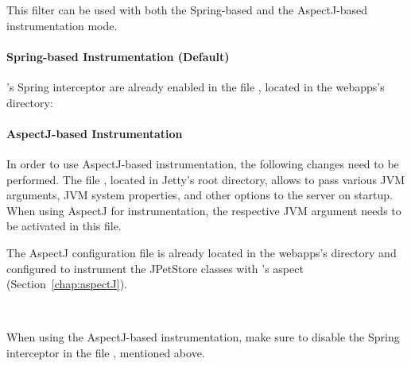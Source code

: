 \noindent This filter can be used with both the Spring-based and the %
AspectJ-based instrumentation mode.

\paragraph{Spring-based Instrumentation (Default)}

\Kieker{}'s Spring interceptor are already enabled in the file 
, located in the webapps's  directory: 

\setXMLListing



\paragraph{AspectJ-based Instrumentation}

\enlargethispage{1cm}

In order to use AspectJ-based instrumentation, the following changes need to 
be performed. The file , located in Jetty's root directory, %
allows to pass various JVM arguments, JVM system properties, and other options %
to the server on startup. When using AspectJ for instrumentation, the respective %
JVM argument needs to be activated in this file. %

The AspectJ configuration file  is already located in the %
webapps's\linebreak {} directory and configured to instrument %
the JPetStore classes with \Kieker{}'s  aspect %
(Section~\ref{chap:aspectJ}). 

\

When using the AspectJ-based instrumentation, make sure to disable the Spring %
interceptor in the file , mentioned above. %

